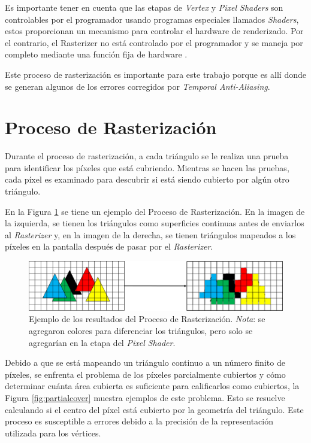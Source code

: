 \documentclass[pregrado]{tesis-usb} %
\begin{document}
Es importante tener en cuenta que las etapas de \textit{Vertex} y \textit{Pixel Shaders} son controlables por el programador usando programas especiales llamados \textit{Shaders}, estos proporcionan un mecanismo para controlar el hardware de renderizado. Por el contrario, el Rasterizer no está controlado por el programador y se maneja por completo mediante una función fija de hardware \cite{Doggett2017EDAF80}. 

Este proceso de rasterización es importante para este trabajo porque es allí donde se generan algunos de los errores corregidos por \textit{Temporal Anti-Aliasing}.


\section{Proceso de Rasterización}
Durante el proceso de rasterización, a cada triángulo se le realiza una prueba para identificar los píxeles que está cubriendo. Mientras se hacen las pruebas, cada píxel es examinado para descubrir si está siendo cubierto por algún otro triángulo.

En la Figura \ref{fig:rasterizationproc} se tiene un ejemplo del Proceso de Rasterización. En la imagen de la izquierda, se tienen los triángulos como superficies continuas antes de enviarlos al \textit{Rasterizer} y, en la imagen de la derecha, se tienen triángulos mapeados a los píxeles en la pantalla después de pasar por el \textit{Rasterizer}.

\begin{figure}[!hbt]
	\centering
	\includegraphics[scale=0.75]{images/rasterization_process.png} 
	\caption{Ejemplo de los resultados del Proceso de Rasterización.
		\emph{Nota}: se agregaron colores para diferenciar los triángulos, pero solo se agregarían en la etapa del \textit{Pixel Shader}.
	}\label{fig:rasterizationproc}
\end{figure}

Debido a que se está mapeando un triángulo continuo a un número finito de píxeles, se enfrenta el problema de los píxeles parcialmente cubiertos y cómo determinar cuánta área cubierta es suficiente para calificarlos como cubiertos, la Figura \ref{fig:partialcover} muestra ejemplos de este problema. Esto se resuelve calculando si el centro del píxel está cubierto por la geometría del triángulo. Este proceso es susceptible a errores debido a la precisión de la representación utilizada para los vértices.
\end{document}
